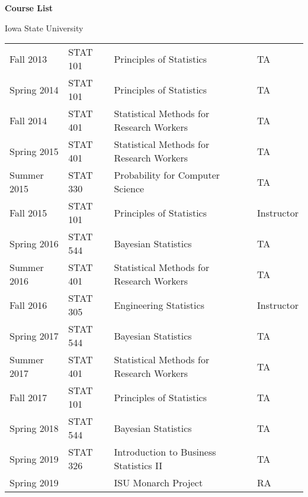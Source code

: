 \documentclass{article}
\begin{document}
\newpage

\textbf{Course List}

Iowa State University
\begin{table}[htp]
\begin{tabular}{llll}
\hline
Fall 2013	  & STAT 101 & Principles of Statistics & TA \\
Spring 2014 & STAT 101 & Principles of Statistics & TA \\
Fall 2014   & STAT 401 & Statistical Methods for Research Workers & TA \\
Spring 2015 & STAT 401 & Statistical Methods for Research Workers & TA \\
Summer 2015 & STAT 330 & Probability for Computer Science & TA \\
Fall 2015   & STAT 101 & Principles of Statistics & Instructor \\
Spring 2016 & STAT 544 & Bayesian Statistics & TA \\
Summer 2016 & STAT 401 & Statistical Methods for Research Workers & TA \\
Fall 2016   & STAT 305 & Engineering Statistics & Instructor \\
Spring 2017 & STAT 544 & Bayesian Statistics & TA \\
Summer 2017 & STAT 401 & Statistical Methods for Research Workers & TA \\
Fall 2017	  & STAT 101 & Principles of Statistics & TA \\
Spring 2018 & STAT 544 & Bayesian Statistics & TA \\
Spring 2019 & STAT 326 & Introduction to Business Statistics II & TA \\
Spring 2019 &          & ISU Monarch Project & RA \\
\hline
\end{tabular}
\end{table}
\end{document}
